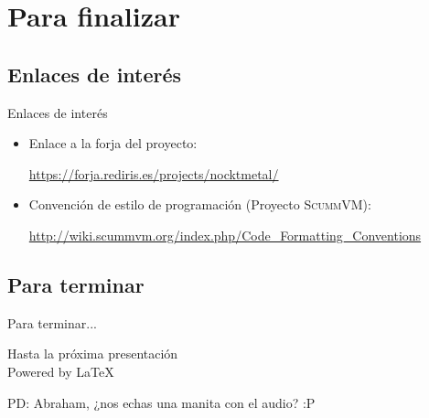 \documentclass[9pt,xcolor=svgnames]{beamer}
\begin{document}
  \section{Para finalizar}
  
  \subsection{Enlaces de interés}
  
  \begin{frame}{Enlaces de interés}
   \transdissolve
   
   \begin{itemize}
   \item Enlace a la forja del proyecto:
   
  \url{https://forja.rediris.es/projects/nocktmetal/}
  
  \item Convención de estilo de programación (Proyecto \textsc{ScummVM}):
  
  \url{http://wiki.scummvm.org/index.php/Code_Formatting_Conventions}
   \end{itemize}
  \end{frame}
  
  
  \subsection{Para terminar}
  
  
  \begin{frame}{Para terminar...}
   \transdissolve
   
   \begin{center}
   \Large Hasta la próxima presentación\\
   
   \Huge Powered by \LaTeX\\[3cm]
   \end{center}
   
   \normalsize
   
   PD: Abraham, ¿nos echas una manita con el audio? :P
   
  \end{frame}
  
\end{document}
